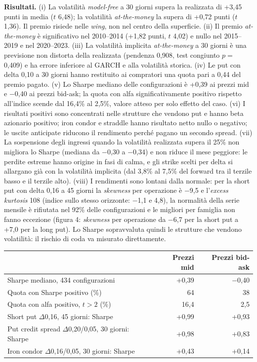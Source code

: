 \documentclass[11pt,a4paper]{article}
\begin{document}
\textbf{Risultati.} (i) La volatilità \emph{model-free} a 30 giorni supera la realizzata di +3{,}45 punti in media ($t$ 6{,}48); la volatilità \emph{at-the-money} la supera di +0{,}72 punti ($t$ 1{,}36). Il premio risiede nelle \emph{wing}, non nel centro della superficie. (ii) Il premio \emph{at-the-money} è significativo nel 2010--2014 (+1{,}82 punti, $t$ 4{,}02) e nullo nel 2015--2019 e nel 2020--2023. (iii) La volatilità implicita \emph{at-the-money} a 30 giorni è una previsione non distorta della realizzata (pendenza 0{,}908, test congiunto $p=$ 0{,}409) e ha errore inferiore al GARCH e alla volatilità storica. (iv) Le put con delta 0{,}10 a 30 giorni hanno restituito ai compratori una quota pari a 0{,}44 del premio pagato. (v) Lo Sharpe mediano delle configurazioni è +0{,}39 ai prezzi mid e $-$0{,}40 ai prezzi bid-ask; la quota con alfa significativamente positivo rispetto all'indice scende dal 16{,}4\% al 2{,}5\%, valore atteso per solo effetto del caso. (vi) I risultati positivi sono concentrati nelle strutture che vendono put e hanno beta azionario positivo; iron condor e straddle hanno risultato netto nullo o negativo; le uscite anticipate riducono il rendimento perché pagano un secondo spread. (vii) La sospensione degli ingressi quando la volatilità realizzata supera il 25\% non migliora lo Sharpe (mediana da $-$0{,}30 a $-$0{,}34) e non riduce il mese peggiore: le perdite estreme hanno origine in fasi di calma, e gli strike scelti per delta si allargano già con la volatilità implicita (dal 3{,}8\% al 7{,}5\% del forward tra il terzile basso e il terzile alto). (viii) I rendimenti sono lontani dalla normale: per la short put con delta 0{,}16 a 45 giorni la \emph{skewness} per operazione è $-$9{,}5 e l'\emph{excess kurtosis} 108 (indice sullo stesso orizzonte: $-$1{,}1 e 4{,}8), la normalità della serie mensile è rifiutata nel 92\% delle configurazioni e le migliori per famiglia non fanno eccezione (figura 4: \emph{skewness} per operazione da $-$6{,}7 per la short put a +7{,}0 per la long put). Lo Sharpe sopravvaluta quindi le strutture che vendono volatilità: il rischio di coda va misurato direttamente.

\begin{center}\small
\begin{tabular}{lrr}\toprule
 & Prezzi mid & Prezzi bid-ask \\ \midrule
Sharpe mediano, 434 configurazioni & +0{,}39 & $-$0{,}40 \\
Quota con Sharpe positivo (\%) & 64 & 38 \\
Quota con alfa positivo, $t>2$ (\%) & 16{,}4 & 2{,}5 \\
Short put $\Delta$0{,}16, 45 giorni: Sharpe & +0{,}99 & +0{,}93 \\
Put credit spread $\Delta$0{,}20/0{,}05, 30 giorni: Sharpe & +0{,}98 & +0{,}83 \\
Iron condor $\Delta$0{,}16/0{,}05, 30 giorni: Sharpe & +0{,}43 & +0{,}14 \\
\bottomrule\end{tabular}
\end{center}
\end{document}
